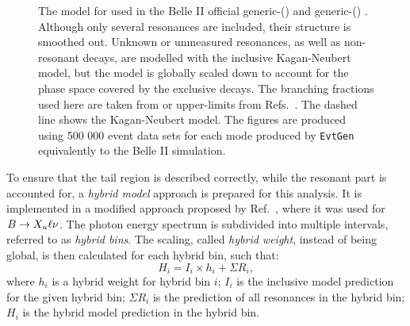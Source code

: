 \begin{figure}[hbtp!]
    \centering
    \caption{\label{fig:generic_Xs_model} The model for \BtoXsgamma used in the Belle II official generic-\Bp () and generic-\Bz () \MC.
    Although only several resonances are included, their structure is smoothed out.
    Unknown or unmeasured resonances, as well as non-resonant decays, are modelled with the inclusive Kagan-Neubert model, but the model is globally scaled down to account for the phase space covered by the exclusive decays.
    The branching fractions used here are taken from  or upper-limits from Refs.~\cite{Workman:2022ynf,Amhis:2022mac}.
    The dashed line shows the Kagan-Neubert model.
    The figures are produced using 500 000 event data sets for each mode produced by \texttt{EvtGen} equivalently to the Belle II simulation.
    }    
\end{figure}

To ensure that the tail region is described correctly, while the resonant part is accounted for, a \textit{hybrid model} approach is prepared for this analysis.
It is implemented in a modified approach proposed by Ref.~\cite{Ramirez:1989yk}, where it was used for $B\rightarrow X_u\ell\nu$.
The \BtoXsgamma photon energy spectrum is subdivided into multiple intervals, referred to as \textit{hybrid bins}.
The scaling, called \textit{hybrid weight}, instead of being global, is then calculated for each hybrid bin, such that:
\begin{equation}\label{eq:hybrid_model_definition}
    H_i = I_i\times h_i + \Sigma R_i,
\end{equation}
where $h_i$ is a hybrid weight for hybrid bin $i$; 
$I_i$ is the inclusive model prediction for the given hybrid bin; 
$\Sigma R_i$ is the prediction of all resonances in the hybrid bin;
$H_i$ is the hybrid model prediction in the hybrid bin.

